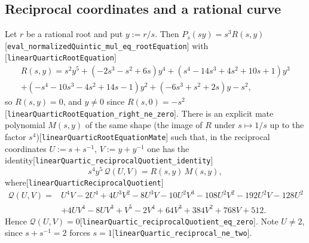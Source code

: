 \documentclass[10pt]{article}
\theoremstyle{definition}
\theoremstyle{remark}
\newcommand{\leanref}[1]{{\scriptsize\textup{[\texttt{#1}]}}\allowbreak}
\begin{document}
\subsection{Reciprocal coordinates and a rational curve}

Let $r$ be a rational root and put $y:=r/s$.  Then $P_s(sy)=s^3R(s,y)$
\leanref{eval\_\allowbreak normalized\allowbreak Quintic\_\allowbreak mul\_\allowbreak eq\_\allowbreak root\allowbreak Equation} with
\leanref{linear\allowbreak Quartic\allowbreak Root\allowbreak Equation}
\begin{multline*}
R(s,y)=s^2y^5+(-2s^3-s^2+6s)y^4+(s^4-14s^3+4s^2+10s+1)y^3\\
+(-s^4-10s^3-4s^2+14s-1)y^2+(-6s^3+s^2+2s)y-s^2,
\end{multline*}
so $R(s,y)=0$, and $y\ne0$ since $R(s,0)=-s^2$
\leanref{linear\allowbreak Quartic\allowbreak Root\allowbreak Equation\_\allowbreak right\_\allowbreak ne\_\allowbreak zero}.  There is an explicit
mate polynomial $M(s,y)$ of the same shape (the image of $R$ under
$s\mapsto1/s$ up to the factor $s^4$)\leanref{linear\allowbreak Quartic\allowbreak Root\allowbreak Equation\allowbreak Mate}
such that, in the reciprocal coordinates $U:=s+s^{-1}$, $V:=y+y^{-1}$ one has the
identity\leanref{linear\allowbreak Quartic\_\allowbreak reciprocal\allowbreak Quotient\_\allowbreak identity}
\begin{equation}\label{eq:RM}
 s^4y^5\,\mathcal{Q}(U,V)=R(s,y)\,M(s,y),
\end{equation}
where\leanref{linear\allowbreak Quartic\allowbreak Reciprocal\allowbreak Quotient}
\begin{equation}\label{eq:QUV}
\begin{aligned}
\mathcal{Q}(U,V)={}&U^4V-2U^4+4U^3V^2-8U^3V-10U^2V^3-108U^2V^2-192U^2V-128U^2\\
&+4UV^4-8UV^3+V^5-2V^4+64V^3+384V^2+768V+512 .
\end{aligned}
\end{equation}
Hence $\mathcal{Q}(U,V)=0$\leanref{linear\allowbreak Quartic\_\allowbreak reciprocal\allowbreak Quotient\_\allowbreak eq\_\allowbreak zero}.
Note $U\ne2$, since $s+s^{-1}=2$ forces $s=1$\leanref{linear\allowbreak Quartic\_\allowbreak reciprocal\_\allowbreak ne\_\allowbreak two}.
\end{document}
